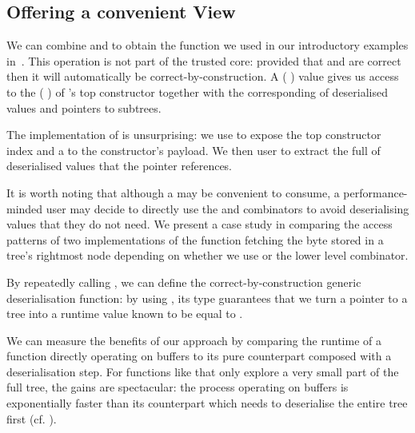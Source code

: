 \subsection{Offering a convenient View}\label{sec:dataview}

We can combine  and  to obtain
the  function we used in our introductory examples
in~.
%
This operation is not part of the trusted core: provided that
 and  are correct then
it will automatically be correct-by-construction.
%
A (  ) value gives us
access to the ( ) of
's top constructor together with the corresponding
 of deserialised values and pointers to subtrees.


The implementation of  is unsurprising: we use
 to expose the top constructor index and a
 to the constructor's payload.
%
We then user  to extract the full
 of deserialised values that the
pointer references.


It is worth noting that although a  may be
convenient to consume, a performance-minded user may decide to
directly use the  and 
combinators to avoid deserialising values that they do not need.
%
We present a case study in  comparing the
access patterns of two implementations of the function fetching the
byte stored in a tree's rightmost node depending on whether we use
 or the lower level  combinator.

By repeatedly calling , we can define the
correct-by-construction generic deserialisation function: by
using , its type guarantees that we turn
a pointer to a tree  into a runtime value known
to be equal to .


We can measure the benefits of our approach by comparing the runtime
of a function directly operating on buffers to its pure counterpart
composed with a deserialisation step.
%
For functions like  that only explore a
very small part of the full tree, the gains are spectacular: the
process operating on buffers is exponentially faster than its
counterpart which needs to deserialise the entire tree first
(cf. ).
